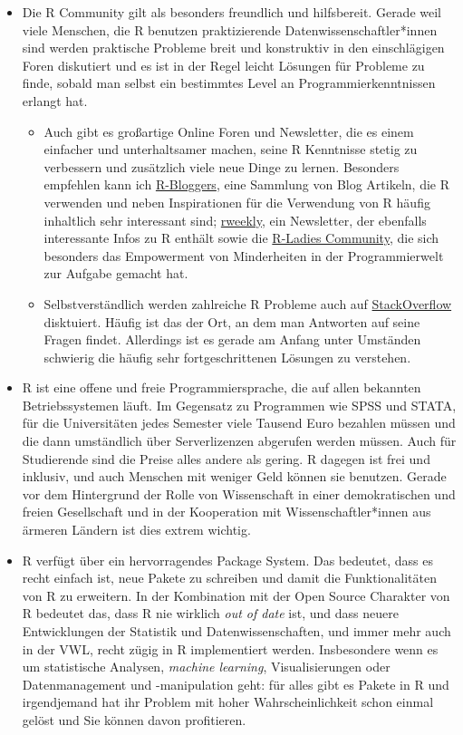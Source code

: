 \documentclass[]{tufte-book}
\providecommand{\tightlist}{%
  \setlength{\itemsep}{0pt}\setlength{\parskip}{0pt}}
\begin{document}
\begin{itemize}
\item
  Die R Community gilt als besonders freundlich und hilfsbereit. Gerade
  weil viele Menschen, die R benutzen praktizierende
  Datenwissenschaftler*innen sind werden praktische Probleme breit und
  konstruktiv in den einschlägigen Foren diskutiert und es ist in der
  Regel leicht Lösungen für Probleme zu finde, sobald man selbst ein
  bestimmtes Level an Programmierkenntnissen erlangt hat.

  \begin{itemize}
  \tightlist
  \item
    Auch gibt es großartige Online Foren und Newsletter, die es einem
    einfacher und unterhaltsamer machen, seine R Kenntnisse stetig zu
    verbessern und zusätzlich viele neue Dinge zu lernen. Besonders
    empfehlen kann ich \href{https://www.r-bloggers.com/}{R-Bloggers},
    eine Sammlung von Blog Artikeln, die R verwenden und neben
    Inspirationen für die Verwendung von R häufig inhaltlich sehr
    interessant sind; \href{https://rweekly.org/}{rweekly}, ein
    Newsletter, der ebenfalls interessante Infos zu R enthält sowie die
    \href{https://rladies.org/}{R-Ladies Community}, die sich besonders
    das Empowerment von Minderheiten in der Programmierwelt zur Aufgabe
    gemacht hat.
  \item
    Selbstverständlich werden zahlreiche R Probleme auch auf
    \href{https://stackoverflow.com/tags/r/info}{StackOverflow}
    disktuiert. Häufig ist das der Ort, an dem man Antworten auf seine
    Fragen findet. Allerdings ist es gerade am Anfang unter Umständen
    schwierig die häufig sehr fortgeschrittenen Lösungen zu verstehen.
  \end{itemize}
\item
  R ist eine offene und freie Programmiersprache, die auf allen
  bekannten Betriebssystemen läuft. Im Gegensatz zu Programmen wie SPSS
  und STATA, für die Universitäten jedes Semester viele Tausend Euro
  bezahlen müssen und die dann umständlich über Serverlizenzen abgerufen
  werden müssen. Auch für Studierende sind die Preise alles andere als
  gering. R dagegen ist frei und inklusiv, und auch Menschen mit weniger
  Geld können sie benutzen. Gerade vor dem Hintergrund der Rolle von
  Wissenschaft in einer demokratischen und freien Gesellschaft und in
  der Kooperation mit Wissenschaftler*innen aus ärmeren Ländern ist dies
  extrem wichtig.
\item
  R verfügt über ein hervorragendes Package System. Das bedeutet, dass
  es recht einfach ist, neue Pakete zu schreiben und damit die
  Funktionalitäten von R zu erweitern. In der Kombination mit der Open
  Source Charakter von R bedeutet das, dass R nie wirklich \emph{out of
  date} ist, und dass neuere Entwicklungen der Statistik und
  Datenwissenschaften, und immer mehr auch in der VWL, recht zügig in R
  implementiert werden. Insbesondere wenn es um statistische Analysen,
  \emph{machine learning}, Visualisierungen oder Datenmanagement und
  -manipulation geht: für alles gibt es Pakete in R und irgendjemand hat
  ihr Problem mit hoher Wahrscheinlichkeit schon einmal gelöst und Sie
  können davon profitieren.


\end{itemize}
\end{document}
